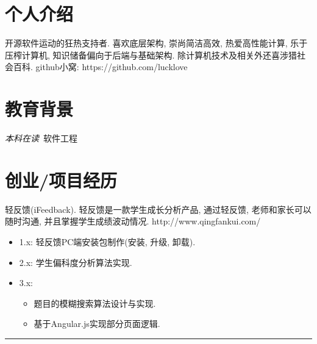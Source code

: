 \documentclass{resume}
\newcommand{\subsectionrule}{{\vspace{-8pt}\hspace{0.5cm}\rule[1pt]{\linewidth-1cm}{0.05pt}\vspace{-8pt}}}
\begin{document}


\section{\faUser 个人介绍}
开源软件运动的狂热支持者.
\newline
喜欢底层架构, 崇尚简洁高效, 热爱高性能计算, 乐于压榨计算机, 知识储备偏向于后端与基础架构.
\newline
除计算机技术及相关外还喜涉猎社会百科.
\newline
github小窝: https://github.com/lucklove

\section{\faGraduationCap 教育背景}
\textit{本科在读}\ 软件工程

\section{\faStar 创业/项目经历}
\begin{onehalfspacing}
轻反馈(iFeedback).
\newline
轻反馈是一款学生成长分析产品, 通过轻反馈, 老师和家长可以随时沟通, 并且掌握学生成绩波动情况.
\newline
http://www.qingfankui.com/
\begin{itemize}
  \item 1.x: 轻反馈PC端安装包制作(安装, 升级, 卸载).
  \item 2.x: 学生偏科度分析算法实现.
  \item 3.x:
  \begin{itemize} 
    \item 题目的模糊搜索算法设计与实现.
    \item 基于Angular.js实现部分页面逻辑.
  \end{itemize}
\end{itemize}
\end{onehalfspacing}

\subsectionrule
\end{document}
